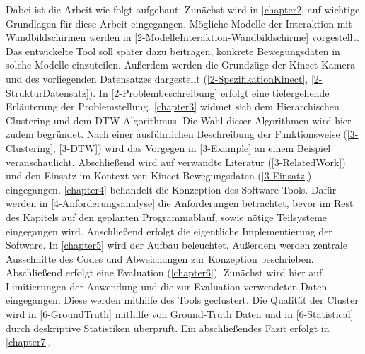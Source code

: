 Dabei ist die Arbeit wie folgt aufgebaut:
Zunächst wird in \autoref{chapter2} auf wichtige Grundlagen für diese Arbeit eingegangen.
Mögliche Modelle der Interaktion mit Wandbildschirmen
werden in \autoref{2-ModelleInteraktion-Wandbildschirme} vorgestellt.
Das entwickelte Tool soll später dazu beitragen, konkrete Bewegungsdaten in solche Modelle einzuteilen.
Außerdem werden die Grundzüge der Kinect Kamera und des vorliegenden Datensatzes dargestellt
(\autoref{2-SpezifikationKinect}, \autoref{2-StrukturDatensatz}).
In \autoref{2-Problembeschreibung} erfolgt eine tiefergehende Erläuterung der Problemstellung.
\autoref{chapter3} widmet sich dem Hierarchischen Clustering und dem \ac*{DTW}-Algorithmus.
Die Wahl dieser Algorithmen wird hier zudem begründet.
Nach einer ausführlichen Beschreibung der Funktionsweise (\autoref{3-Clustering}, \autoref{3-DTW})
wird das Vorgegen in \autoref{3-Example} an einem Beispiel veranschaulicht.
Abschließend wird auf verwandte Literatur (\autoref{3-RelatedWork})
und den Einsatz im Kontext von Kinect-Bewegungsdaten (\autoref{3-Einsatz}) eingegangen.
\autoref{chapter4} behandelt die Konzeption des Software-Tools.
Dafür werden in \autoref{4-Anforderungsanalyse} die Anforderungen betrachtet,
bevor im Rest des Kapitels auf den geplanten Programmablauf,
sowie nötige Teilsysteme eingegangen wird.
Anschließend erfolgt die eigentliche Implementierung der Software.
In \autoref{chapter5} wird der Aufbau beleuchtet.
Außerdem werden zentrale Ausschnitte des Codes
und Abweichungen zur Konzeption beschrieben.
Abschließend erfolgt eine Evaluation (\autoref{chapter6}).
Zunächst wird hier auf Limitierungen der Anwendung
und die zur Evaluation verwendeten Daten eingegangen.
Diese werden mithilfe des Tools geclustert.
Die Qualität der Cluster wird in \autoref{6-GroundTruth} mithilfe von Ground-Truth Daten
und in \autoref{6-Statistical} durch deskriptive Statistiken überprüft.
Ein abschließendes Fazit erfolgt in \autoref{chapter7}.